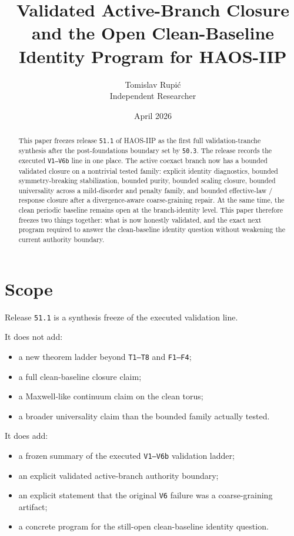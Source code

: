 \documentclass[11pt]{article}
\title{Validated Active-Branch Closure and the Open Clean-Baseline Identity Program for HAOS-IIP}
\author{Tomislav Rupi\'c \\ Independent Researcher}
\date{April 2026}
\begin{document}
\maketitle

\begin{abstract}
This paper freezes release \texttt{51.1} of HAOS-IIP as the first full validation-tranche synthesis after the post-foundations boundary set by \texttt{50.3}. The release records the executed \texttt{V1--V6b} line in one place. The active coexact branch now has a bounded validated closure on a nontrivial tested family: explicit identity diagnostics, bounded symmetry-breaking stabilization, bounded purity, bounded scaling closure, bounded universality across a mild-disorder and penalty family, and bounded effective-law / response closure after a divergence-aware coarse-graining repair. At the same time, the clean periodic baseline remains open at the branch-identity level. This paper therefore freezes two things together: what is now honestly validated, and the exact next program required to answer the clean-baseline identity question without weakening the current authority boundary.
\end{abstract}

\tableofcontents

\section{Scope}

Release \texttt{51.1} is a synthesis freeze of the executed validation line.

It does not add:
\begin{itemize}
\item a new theorem ladder beyond \texttt{T1--T8} and \texttt{F1--F4};
\item a full clean-baseline closure claim;
\item a Maxwell-like continuum claim on the clean torus;
\item a broader universality claim than the bounded family actually tested.
\end{itemize}

It does add:
\begin{itemize}
\item a frozen summary of the executed \texttt{V1--V6b} validation ladder;
\item an explicit validated active-branch authority boundary;
\item an explicit statement that the original \texttt{V6} failure was a coarse-graining artifact;
\item a concrete program for the still-open clean-baseline identity question.
\end{itemize}
\end{document}
